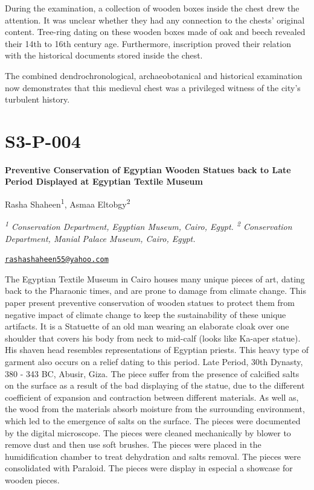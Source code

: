 \documentclass[
]{book}
\begin{document}
During the examination, a collection of wooden boxes inside the chest drew the attention. It was unclear whether they had any connection to the chests' original content. Tree-ring dating on these wooden boxes made of oak and beech revealed their 14th to 16th century age. Furthermore, inscription proved their relation with the historical documents stored inside the chest.

The combined dendrochronological, archaeobotanical and historical examination now demonstrates that this medieval chest was a privileged witness of the city's turbulent history.

\hypertarget{s3-p-004}{%
\section*{S3-P-004}\label{s3-p-004}}

\textbf{Preventive Conservation of Egyptian Wooden Statues back to Late Period Displayed at Egyptian Textile Museum}

Rasha Shaheen\textsuperscript{1}, Asmaa Eltobgy\textsuperscript{2}

\emph{\textsuperscript{1} Conservation Department, Egyptian Museum, Cairo, Egypt. \textsuperscript{2} Conservation Department, Manial Palace Museum, Cairo, Egypt.}

\href{mailto:rashashaheen55@yahoo.com}{\nolinkurl{rashashaheen55@yahoo.com}}

The Egyptian Textile Museum in Cairo houses many unique pieces of art, dating back to the Pharaonic times, and are prone to damage from climate change. This paper present preventive conservation of wooden statues to protect them from negative impact of climate change to keep the sustainability of these unique artifacts. It is a Statuette of an old man wearing an elaborate cloak over one shoulder that covers his body from neck to mid-calf (looks like Ka-aper statue). His shaven head resembles representations of Egyptian priests. This heavy type of garment also occurs on a relief dating to this period. Late Period, 30th Dynasty, 380 - 343 BC, Abusir, Giza. The piece suffer from the presence of calcified salts on the surface as a result of the bad displaying of the statue, due to the different coefficient of expansion and contraction between different materials. As well as, the wood from the materials absorb moisture from the surrounding environment, which led to the emergence of salts on the surface. The pieces were documented by the digital microscope. The pieces were cleaned mechanically by blower to remove dust and then use soft brushes. The pieces were placed in the humidification chamber to treat dehydration and salts removal. The pieces were consolidated with Paraloid. The pieces were display in especial a showcase for wooden pieces.
\end{document}
